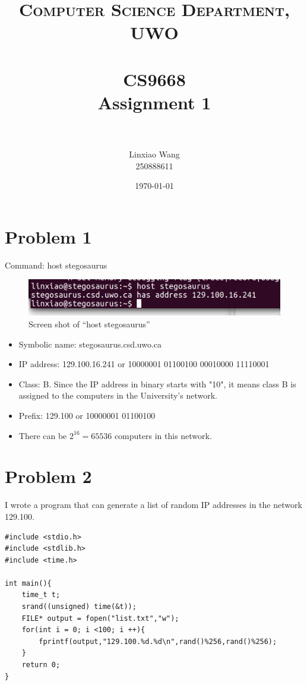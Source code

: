 \documentclass[paper=a4, fontsize=11pt]{scrartcl} %
\title{	
\normalfont \normalsize 
\textsc{Computer Science Department, UWO} \\ [25pt] %
\horrule{0.5pt} \\[0.4cm] %
\huge CS9668\\
Assignment 1 \\ %
\horrule{2pt} \\[0.5cm] %
}
\author{Linxiao Wang\\
	250888611} %
\date{\normalsize\today} %
\numberwithin{equation}{section} %
\numberwithin{figure}{section} %
\numberwithin{table}{section} %
\begin{document}
\maketitle %


\section*{Problem 1}
Command: host stegosaurus

\begin{figure}[h]
	\centering
	\includegraphics[width=\textwidth]{A1Q1.png}
	\caption{Screen shot of ``host stegosaurus''}
	\label{fig:pingstego}
\end{figure}
\begin{itemize}
\item Symbolic name: stegosaurus.csd.uwo.ca

\item IP address: 129.100.16.241 or
			10000001 01100100 00010000 11110001
			
\item Class: B. Since the IP address in binary starts with "10", it means class B is assigned to the computers in the University's network.

\item Prefix: 129.100 or 10000001 01100100

\item There can be $2^{16} = 65536$ computers in this network.		

\end{itemize}

\section*{Problem 2}
I wrote a program that can generate a list of random IP addresses in the network 129.100. 
\begin{lstlisting}[caption={C code for generating random IP addresses},captionpos=b,label = {lst:generateip}]
#include <stdio.h>
#include <stdlib.h>
#include <time.h>

int main(){
	time_t t;
	srand((unsigned) time(&t));
	FILE* output = fopen("list.txt","w");
	for(int i = 0; i <100; i ++){
		fprintf(output,"129.100.%d.%d\n",rand()%256,rand()%256);
	}
	return 0;
}
\end{lstlisting}
\end{document}
